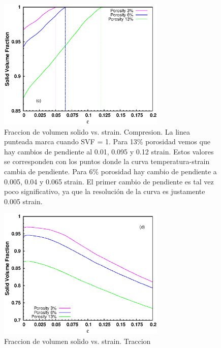 \documentclass[10pt, oneside]{article} %
\begin{document}
\begin{figure}[H]
\centering
\includegraphics[width=8cm]{Figures/porosity_SVF_strain_comp_dash.eps}
\caption{Fraccion de volumen solido vs. strain. Compresion. La linea punteada marca cuando SVF = 1. Para 13\% porosidad vemos que hay cambios de pendiente al 0.01, 0.095 y 0.12 strain. Estos valores se corresponden con los puntos donde la curva temperatura-strain cambia de pendiente. Para 6\% porosidad hay cambio de pendiente a 0.005, 0.04 y 0.065 strain. El primer cambio de pendiente es tal vez poco significativo, ya que la resolución de la curva es justamente 0.005 strain. }
\end{figure}


\begin{figure}[H]
\centering
\includegraphics[width=8cm]{Figures/porosity_SVF_strain_tens.eps}
\caption{Fraccion de volumen solido vs. strain. Traccion}
\end{figure}

\end{document}
